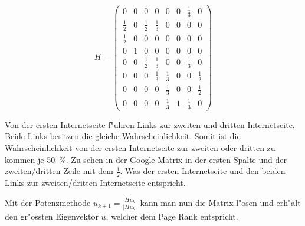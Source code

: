\begin{refsection}
\begin{beispiel}
$$
    H =
    \begin{pmatrix}
      0 & 0 & 0 & 0 & 0 & 0 & \frac{1}{3} & 0\\
      \frac{1}{2} & 0 & \frac{1}{2} & \frac{1}{3} & 0 & 0 & 0 & 0\\
      \frac{1}{2} & 0 & 0 & 0 & 0 & 0 & 0 & 0\\
      0 & 1 & 0 & 0 & 0 & 0 & 0 & 0\\
      0 & 0 & \frac{1}{2} & \frac{1}{3} & 0 & 0 &
        \frac{1}{3} & 0\\
      0 & 0 & 0 & \frac{1}{3} & \frac{1}{3} & 0 & 0 & \frac{1}{2}\\
      0 & 0 & 0 & 0 & \frac{1}{3} & 0 & 0 & \frac{1}{2}\\
      0 & 0 & 0 & 0 & \frac{1}{3} & 1 & \frac{1}{3} & 0
    \end{pmatrix}
$$

  Von der ersten Internetseite f"uhren Links zur zweiten und dritten
  Internetseite.  Beide Links besitzen die gleiche Wahrscheinlichkeit.
  Somit ist die Wahrscheinlichkeit von der ersten Internetseite zur
  zweiten oder dritten zu kommen je \SI{50}{\percent}.  Zu sehen in
  der Google Matrix in der ersten Spalte und der zweiten/dritten Zeile
  mit dem $\frac{1}{2}$.  Was der ersten Internetseite und den beiden
  Links zur zweiten/dritten Internetseite entspricht.

  Mit der Potenzmethode $u_{k+1} = \frac{Hu_k}{|Hu_k|}$ kann man nun
  die Matrix l"osen und erh"alt den gr"ossten Eigenvektor $u$,
  welcher dem Page Rank entspricht.
\end{beispiel}

\end{refsection}
